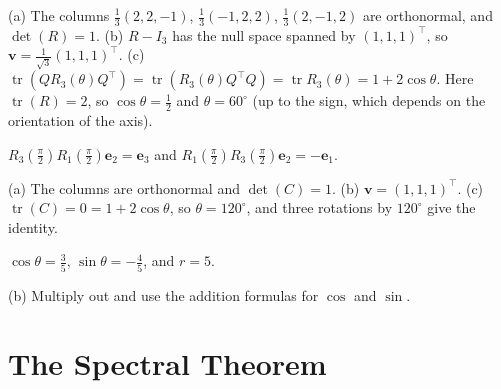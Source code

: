 \documentclass[11pt]{article}
\DeclareMathOperator{\tr}{tr}
\begin{document}
\begin{description}[leftmargin=0pt, itemsep=0.3em]
    \item[\ref{pr:rot-axis-angle}.] (a) The columns $\frac{1}{3}(2, 2, -1)$, $\frac{1}{3}(-1, 2, 2)$, $\frac{1}{3}(2, -1, 2)$ are orthonormal, and $\det(R) = 1$. (b) $R - I_3$ has the null space spanned by $(1, 1, 1)^\top$, so $\mathbf{v} = \frac{1}{\sqrt{3}}(1, 1, 1)^\top$. (c) $\tr(QR_3(\theta)Q^\top) = \tr(R_3(\theta)Q^\top Q) = \tr R_3(\theta) = 1 + 2\cos\theta$. Here $\tr(R) = 2$, so $\cos\theta = \frac{1}{2}$ and $\theta = 60^\circ$ (up to the sign, which depends on the orientation of the axis).
    \item[\ref{pr:rot-noncomm}.] $R_3(\frac{\pi}{2})R_1(\frac{\pi}{2}) \mathbf{e}_2 = \mathbf{e}_3$ and $R_1(\frac{\pi}{2})R_3(\frac{\pi}{2}) \mathbf{e}_2 = -\mathbf{e}_1$.
    \item[\ref{pr:rot-axis}.] (a) The columns are orthonormal and $\det(C) = 1$. (b) $\mathbf{v} = (1, 1, 1)^\top$. (c) $\tr(C) = 0 = 1 + 2\cos\theta$, so $\theta = 120^\circ$, and three rotations by $120^\circ$ give the identity.
    \item[\ref{pr:givens}.] $\cos\theta = \frac{3}{5}$, $\sin\theta = -\frac{4}{5}$, and $r = 5$.
    \item[\ref{pr:reflections}.] (b) Multiply out and use the addition formulas for $\cos$ and $\sin$.
\end{description}

\section*{The Spectral Theorem}
\end{document}
